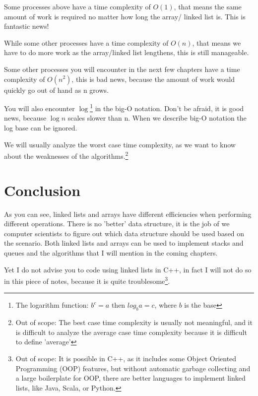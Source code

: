 Some processes above have a time complexity of $O(1)$, that means the same amount of work is required no matter how long the array/ linked list is. This is fantastic news! 

While some other processes have a time complexity of $O(n)$, that means we have to do more work as the array/linked list lengthens, this is still manageable. 

Some other processes you will encounter in the next few chapters have a time complexity of $O(n^2)$, this is bad news, because the amount of work would quickly go out of hand as n grows.

You will also encounter $\log$\footnote{The logarithm function: $b^c = a$ then $log_b a = c$, where $b$ is the base} in the big-O notation. Don't be afraid, it is good news, because $\log n$ scales slower than n. When we describe big-O notation the log base can be ignored.

We will usually analyze the worst case time complexity, as we want to know about the weaknesses of the algorithms.\footnote{Out of scope: The best case time complexity is usually not meaningful, and it is difficult to analyze the average case time complexity because it is difficult to define 'average'}

\section{Conclusion}
As you can see, linked lists and arrays have different efficiencies when performing different operations. There is no 'better' data structure, it is the job of we computer scientists to figure out which data structure should be used based on the scenario. Both linked lists and arrays can be used to implement stacks and queues and the algorithms that I will mention in the coming chapters. 

Yet I do not advise you to code using linked lists in C++, in fact I will not do so in this piece of notes, because it is quite troublesome\footnote{Out of scope: It is possible in C++, as it includes some Object Oriented Programming (OOP) features, but without automatic garbage collecting and a large boilerplate for OOP, there are better languages to implement linked lists, like Java, Scala, or Python.
}.
